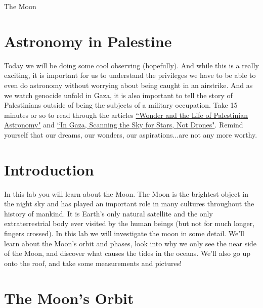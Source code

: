 \documentclass[12pt]{article}%
\begin{document}
\begin{center}
    \LARGE The Moon
\end{center}

\section{Astronomy in Palestine}
Today we will be doing some cool observing (hopefully). And while this is a really exciting, it is important
for us to understand the privileges we have to be able to even do astronomy without worrying
about being caught in an airstrike. And as we watch genocide unfold in Gaza, it is also
important to tell the story of Palestinians outside of being the subjects of a military occupation. 
Take 15 minutes or so to read through the articles 
\href{https://magazine.scienceforthepeople.org/vol23-1/wonder-and-the-life-of-palestinian-astronomy/}{``Wonder and the Life of Palestinian Astronomy"}
and
\href{https://undark.org/2020/03/02/gaza-astronomy/}{``In Gaza, Scanning the Sky for Stars, Not Drones"}. Remind yourself that our dreams, our wonders, our aspirations...are not any more worthy.

\section{Introduction}
In this lab you will learn about the Moon. 
The Moon is the brightest object in the night sky and has played an important role in many cultures throughout the history of mankind. 
It is Earth's only natural satellite and the only extraterrestrial body ever visited by the human beings (but not for much longer, fingers crossed).
In this lab we will investigate the moon in some detail. 
We'll learn about the Moon's orbit and phases, look into why we only see the near side of the Moon, and discover what causes the tides in the oceans. 
We'll also go up onto the roof, and take some measurements and pictures! 


\section{The Moon's Orbit}
\end{document}
